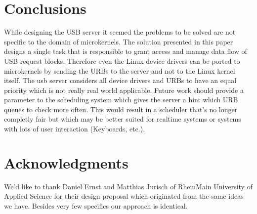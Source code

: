 \documentclass{acm_proc_article-sp}
\begin{document}
\section{Conclusions}
While designing the USB server it seemed the problems to be
solved are not specific to the domain of microkernels.
The solution presented in this paper designs a single task
that is responsible to grant access and manage data flow
of USB request blocks.
Therefore even the Linux device drivers can be ported
to microkernels by sending the URBs to the server and not to
the Linux kernel itself.
The usb server considers all device drivers and URBs to have
an equal priority which is not really real world applicable.
Future work should provide a parameter to the scheduling system
which gives the server a hint which URB queues to check
more often.
This would result in a scheduler that's no longer completly
fair but which may be better suited for realtime systems or
systems with lots of user interaction (Keyboards, etc.).

\section{Acknowledgments}
We'd like to thank Daniel Ernst and Matthias Jurisch
of RheinMain University of Applied Science for their design proposal \cite{ernst}
which originated from the same ideas we have.
Besides very few specifics our approach is identical.

%


%
%
\end{document}
